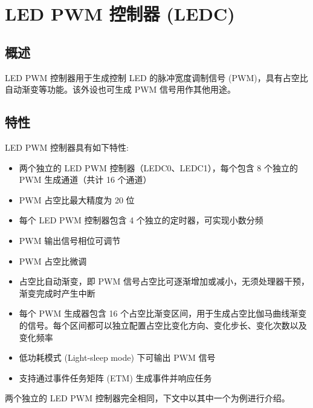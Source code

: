 \documentclass[main\_\_CN.tex]{subfiles}
\begin{document}
\setchineseformatting


\ifglobal
\else
    \clearpage
    \listoftodos
    \listofdonetodos
    \tableofcontents
\fi



\hypertarget{ledpwm}{}
\chapter{LED PWM 控制器 (LEDC)}
\label{mod:ledpwm}

\section{概述}

LED PWM 控制器用于生成控制 LED 的脉冲宽度调制信号 (PWM)，具有占空比自动渐变等功能。该外设也可生成 PWM 信号用作其他用途。

\section{特性}
LED PWM 控制器具有如下特性:
\begin{itemize}
    \item 两个独立的 LED PWM 控制器（LEDC0、LEDC1），每个包含 8 个独立的 PWM 生成通道（共计 16 个通道）
    \item PWM 占空比最大精度为 20 位
    \item 每个 LED PWM 控制器包含 4 个独立的定时器，可实现小数分频
    \item PWM 输出信号相位可调节
    \item PWM 占空比微调
    \item 占空比自动渐变，即 PWM 信号占空比可逐渐增加或减小，无须处理器干预，渐变完成时产生中断
    \item 每个 PWM 生成器包含 16 个占空比渐变区间，用于生成占空比伽马曲线渐变的信号。每个区间都可以独立配置占空比变化方向、变化步长、变化次数以及变化频率
    \item 低功耗模式 (Light-sleep mode) 下可输出 PWM 信号
    \item 支持通过事件任务矩阵 (ETM) 生成事件并响应任务
\end{itemize}

两个独立的 LED PWM 控制器完全相同，下文中以其中一个为例进行介绍。
\end{document}
